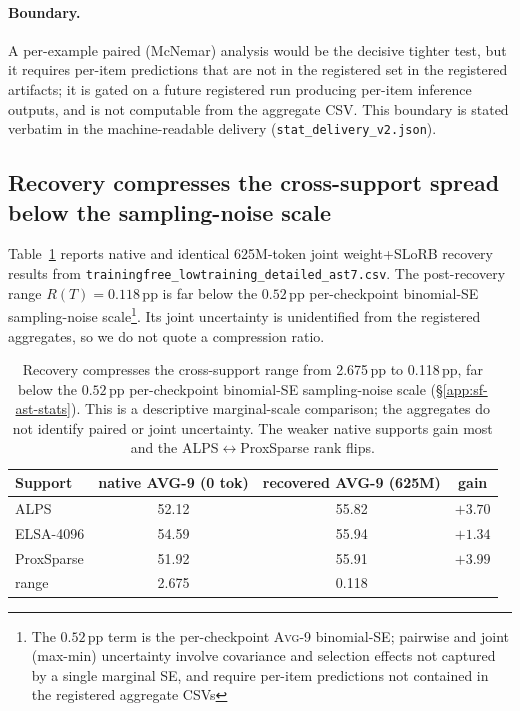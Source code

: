 \documentclass{article}
\newcommand{\taskavg}{\textsc{Avg}-9}
\begin{document}
\paragraph{Boundary.}
A per-example paired (McNemar) analysis would be the decisive tighter test,
but it requires per-item predictions that are not in the registered set
in the registered artifacts; it is gated on a future registered run
producing per-item inference outputs, and is not computable from the
aggregate CSV. This boundary is stated verbatim in the machine-readable
delivery (\texttt{stat\_delivery\_v2.json}).

\subsection{Recovery compresses the cross-support spread below the sampling-noise scale}
\label{app:recovery-compression}

Table~\ref{tab:recovery-compression} reports native and identical 625M-token joint
weight+SLoRB recovery results from
\texttt{trainingfree\_lowtraining\_detailed\_ast7.csv}. The post-recovery range
$R(T)=0.118$\,pp is far below the $0.52$\,pp per-checkpoint binomial-SE
sampling-noise scale\footnote{The $0.52$\,pp term is the per-checkpoint \taskavg{} binomial-SE; pairwise and joint (max-min) uncertainty involve covariance and selection effects not captured by a single marginal SE, and require per-item predictions not contained in the registered aggregate CSVs}. Its joint uncertainty is unidentified from the registered aggregates, so we do not quote a compression ratio.

\begin{table}[h]\centering\small\setlength{\tabcolsep}{6pt}
\caption{Recovery compresses the cross-support range from 2.675\,pp to
0.118\,pp, far below the $0.52$\,pp per-checkpoint binomial-SE sampling-noise
scale (\S\ref{app:sf-ast-stats}). This is a descriptive marginal-scale comparison;
the aggregates do not identify paired or joint uncertainty. The weaker native
supports gain most and the ALPS$\leftrightarrow$ProxSparse rank flips.}
\label{tab:recovery-compression}
\begin{tabular}{lccc}
\toprule
Support & native AVG-9 (0 tok) & recovered AVG-9 (625M) & gain \\
\midrule
ALPS & 52.12 & 55.82 & $+3.70$ \\
ELSA-4096 & 54.59 & 55.94 & $+1.34$ \\
ProxSparse & 51.92 & 55.91 & $+3.99$ \\
\midrule
range & 2.675 & 0.118 & \\
\bottomrule
\end{tabular}
\end{table}
\end{document}
